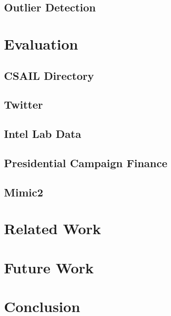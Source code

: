 \documentclass{vldb}
\begin{document}
\subsection{Outlier Detection}
\label{sec:outlier_detection}


\section{Evaluation}
\label{sec:eval}

\subsection{CSAIL Directory}
\label{sec:csail}


\subsection{Twitter}

\subsection{Intel Lab Data}
\label{sec:intel}


\subsection{Presidential Campaign Finance}
\label{sec:president}


\subsection{Mimic2}
\label{sec:mimic2}


\section{Related Work}
\label{sec:related_work}


\section{Future Work}
\label{sec:future}



\section{Conclusion}
\label{sec:concl}








\end{document}
